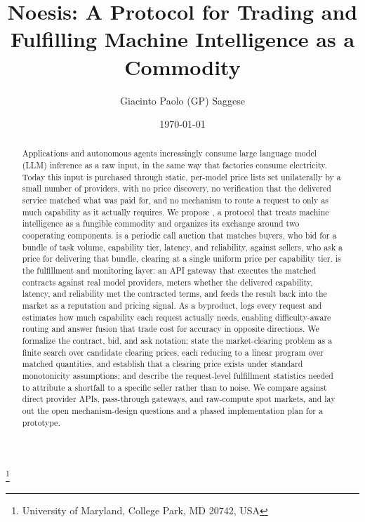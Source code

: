 \title{Noesis: A Protocol for Trading and Fulfilling Machine Intelligence as a Commodity}

\author{Giacinto Paolo (GP) Saggese}
\thanks{University of Maryland, College Park, MD 20742, USA}

\date{\today}


\begin{abstract}
Applications and autonomous agents increasingly consume large language model
(LLM) inference as a raw input, in the same way that factories consume
electricity. Today this input is purchased through static, per-model price
lists set unilaterally by a small number of providers, with no price
discovery, no verification that the delivered service matched what was paid
for, and no mechanism to route a request to only as much capability as it
actually requires.
%
We propose \Noesis, a protocol that treats machine
intelligence as a fungible commodity and organizes its exchange around two
cooperating components.
\NoesisMarket{} is a periodic call auction that
matches buyers, who bid for a bundle of task volume, capability tier,
latency, and reliability, against sellers, who ask a price for delivering
that bundle, clearing at a single uniform price per capability tier.
%
\NoesisServer{} is the fulfillment and monitoring layer: an API gateway that
executes the matched contracts against real model providers, meters whether
the delivered capability, latency, and reliability met the contracted terms,
and feeds the result back into the market as a reputation and pricing signal.
As a byproduct, \NoesisServer{} logs every request and estimates how much
capability each request actually needs, enabling difficulty-aware routing and
answer fusion that trade cost for accuracy in opposite directions.
We formalize the contract, bid, and ask notation; state the market-clearing
problem as a finite search over candidate clearing prices, each reducing to a
linear program over matched quantities, and establish that a clearing price
exists under standard monotonicity assumptions; and describe the
request-level fulfillment
statistics needed to attribute a shortfall to a specific seller rather than
to noise. We compare \Noesis{} against direct provider APIs, pass-through
gateways, and raw-compute spot markets, and lay out the open mechanism-design
questions and a phased implementation plan for a prototype.
\end{abstract}

